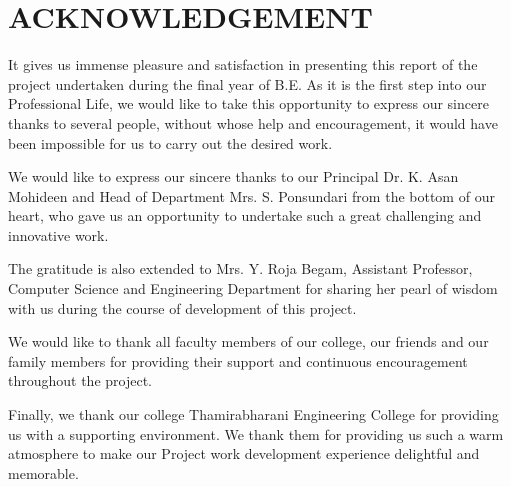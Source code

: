 \chapter*{ACKNOWLEDGEMENT}
It gives us immense pleasure and satisfaction in presenting this report of the project undertaken during the final year of B.E. As it is the first step into our Professional Life, we would like to take this opportunity to express our sincere thanks to several people, without whose help and encouragement, it would have been impossible for us to carry out the desired work.

We would like to express our sincere thanks to our Principal Dr. K. Asan Mohideen and Head of Department Mrs. S. Ponsundari from the bottom of our heart, who gave us an opportunity to undertake such a great challenging and innovative work.

The gratitude is also extended to Mrs. Y. Roja Begam, Assistant Professor, Computer Science and Engineering Department for sharing her pearl of wisdom with us during the course of development of this project.

We would like to thank all faculty members of our college, our friends and our family members for providing their support and continuous encouragement throughout the project. 

Finally, we thank our college Thamirabharani Engineering College for providing us with a supporting environment. We thank them for providing us such a warm atmosphere to make our Project work development experience delightful and memorable. 
